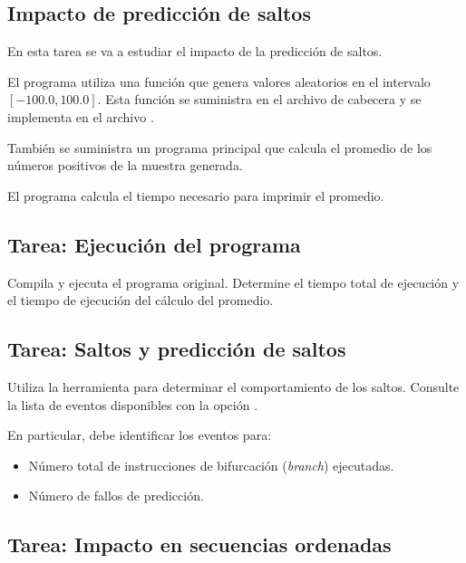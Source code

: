 \clearpage
\subsection{Impacto de predicción de saltos}

En esta tarea se va a estudiar el impacto de la predicción de saltos.

El programa utiliza una función que genera valores aleatorios en el intervalo
$[-100.0, 100.0]$. Esta función se suministra en el archivo de cabecera
 y se implementa en el archivo .





También se suministra un programa principal que calcula el promedio de los números
positivos de la muestra generada.



El programa calcula el tiempo necesario para imprimir el promedio.

\subsection{Tarea: Ejecución del programa}

Compila y ejecuta el programa original. Determine el tiempo total de ejecución y
el tiempo de ejecución del cálculo del promedio.

\subsection{Tarea: Saltos y predicción de saltos}

Utiliza la herramienta  para determinar el comportamiento de los saltos.
Consulte la lista de eventos disponibles con la opción . 

En particular, debe identificar los eventos para:
\begin{itemize}
  \item Número total de instrucciones de bifurcación (\emph{branch}) ejecutadas.
  \item Número de fallos de predicción.
\end{itemize}

\subsection{Tarea: Impacto en secuencias ordenadas}

